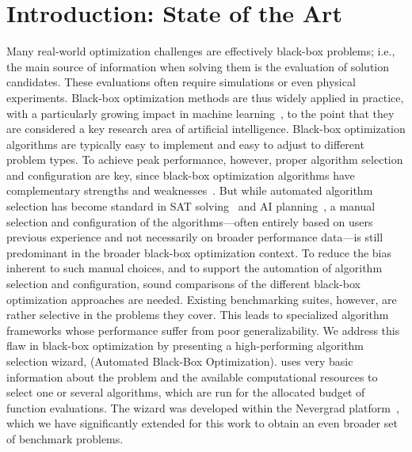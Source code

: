 \section{Introduction: State of the Art}\label{sota}
Many real-world optimization challenges are effectively black-box problems; i.e., the main source of information when solving them is the evaluation of solution candidates. {These evaluations} often {require} simulations or even physical experiments. {Black-box optimization methods are thus widely applied in practice, with a particularly growing impact in} machine learning~\cite{salimans2016improved,lamcts}, to the point that they are considered a key research area of artificial intelligence. Black-box optimization algorithms are typically easy to implement and easy to adjust to different problem types. To achieve peak performance, however, proper algorithm selection and configuration are key, since black-box optimization algorithms have complementary strengths and weaknesses~\cite{rice1976,kerschke2018survey}. But while {automated} algorithm selection has become standard in SAT solving~\cite{satzilla} and AI planning~\cite{AIplanning}, {a manual selection and configuration of the algorithms---often entirely based on users previous experience and not necessarily on broader performance data---is still predominant in the broader black-box optimization context.}
{To reduce the bias inherent to such manual choices, and to support the automation of algorithm selection and configuration, sound comparisons of the different black-box optimization approaches are needed.}  
Existing benchmarking suites, however, are rather selective in the problems they cover. This leads to specialized algorithm frameworks whose performance suffer from poor generalizability. 
{We address this flaw in black-box optimization by presenting a high-performing algorithm selection wizard, \ngoptq{} ({Automated Black-Box Optimization}). \ngoptq{} uses very basic information about the problem and the available computational resources to select one or several algorithms, which are run for the allocated budget of function evaluations. The wizard was developed within the Nevergrad platform~\cite{nevergrad}, which we have significantly extended for this work to obtain an even broader set of benchmark problems.}

